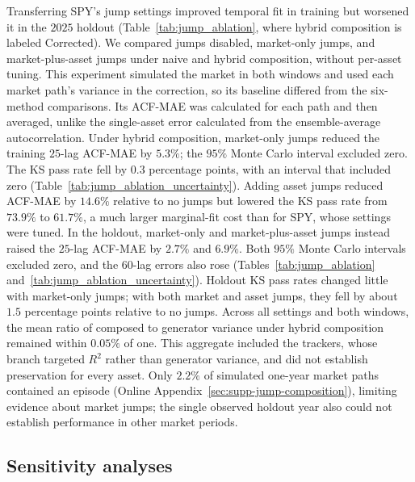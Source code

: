 Transferring SPY's jump settings improved temporal fit in training
but worsened it in the $2025$ holdout
(Table~\ref{tab:jump_ablation}, where hybrid composition is labeled
Corrected). We compared jumps disabled, market-only jumps, and
market-plus-asset jumps under naive and hybrid composition, without
per-asset tuning. This experiment simulated the market in both
windows and used each market path's variance in the correction, so
its baseline differed from the six-method comparisons. Its ACF-MAE
was calculated for each path and then averaged, unlike the
single-asset error calculated from the ensemble-average
autocorrelation. Under hybrid composition, market-only jumps reduced
the training $25$-lag ACF-MAE by $5.3\%$; the $95\%$ Monte Carlo
interval excluded zero. The KS pass rate fell by $0.3$ percentage
points, with an interval that included zero
(Table~\ref{tab:jump_ablation_uncertainty}). Adding asset jumps
reduced ACF-MAE by $14.6\%$ relative to no jumps but lowered the KS
pass rate from $73.9\%$ to $61.7\%$, a much larger marginal-fit
cost than for SPY, whose settings were tuned. In the holdout,
market-only and market-plus-asset jumps instead raised the $25$-lag
ACF-MAE by $2.7\%$ and $6.9\%$. Both $95\%$ Monte Carlo
intervals excluded zero, and the $60$-lag errors also rose
(Tables~\ref{tab:jump_ablation}
and~\ref{tab:jump_ablation_uncertainty}). Holdout KS pass rates
changed little with market-only jumps; with both market and asset
jumps, they fell by about $1.5$ percentage points relative to no jumps. Across all settings
and both windows, the mean ratio of composed to generator variance
under hybrid composition remained within $0.05\%$ of one. This
aggregate included the trackers, whose branch targeted $R^2$ rather
than generator variance, and did not establish preservation for every
asset. Only $2.2\%$ of simulated one-year market paths contained an
episode (Online Appendix~\ref{sec:supp-jump-composition}), limiting evidence
about market jumps; the single observed holdout year also could not
establish performance in other market periods.


\subsection{Sensitivity analyses}

